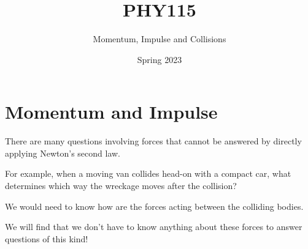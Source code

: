 \documentclass[]{beamer}
\title{PHY115}    %
\author{Momentum, Impulse and Collisions}                 %
\institute{Digipen}      %
\date{Spring 2023}
\begin{document}
\begin{frame}
  \titlepage
\end{frame}

\section[]{}

\begin{frame}
  \tableofcontents
\end{frame}

\section{Momentum and Impulse}

\begin{frame}


There are many questions involving forces that cannot be answered by
directly applying Newton’s second law. 

\pause
\vspace{3mm}


For example, when a moving van collides head-on with a compact car, what determines which
way the wreckage moves after the collision?


\pause
\vspace{3mm}

We would need to know how are the forces acting between the colliding bodies.
\pause
\vspace{3mm}


We will find  that we don’t have to know anything about these forces to answer
questions of this kind!

    
\end{frame}


\end{document}
